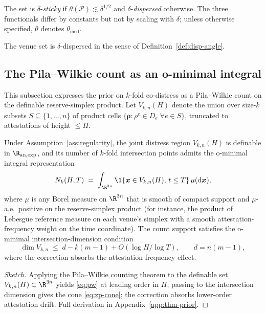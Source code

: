 The set is $\delta$-\emph{sticky} if
$\theta(\mathcal{P}) \lesssim \delta^{1/2}$ and
$\delta$-\emph{dispersed} otherwise. The three functionals differ by
constants but not by scaling with $\delta$; unless otherwise
specified, $\theta$ denotes $\theta_{\mathrm{med}}$.

\begin{assumption}\label{ass:dispersion}
The venue set is $\delta$-dispersed in the sense of
Definition~\ref{def:disp-angle}.
\end{assumption}

\subsection{The Pila--Wilkie count as an o-minimal integral}
\label{sec:common-factor}

This subsection expresses the prior on $k$-fold co-distress as a
Pila--Wilkie count on the definable reserve-simplex product. Let
$V_{k,n}(H)$ denote the union over size-$k$ subsets
$S \subseteq \{1,\dots,n\}$ of product cells
$\{\boldsymbol{\rho} : \rho^e \in D_e \; \forall e \in S\}$,
truncated to attestations of height $\le H$.

\begin{proposition}\label{prop:pw}
Under Assumption~\ref{ass:regularity}, the joint distress region
$V_{k,n}(H)$ is definable in $\R_{\mathrm{an},\exp}$, and its
number of $k$-fold intersection points admits the o-minimal
integral representation
\begin{equation}\label{eq:pw}
N_k(H,T) \;=\;
\int_{\R^{3n}} \1\{\boldsymbol{x} \in V_{k,n}(H),\, t \le T\}\,
\mu(\mathrm{d}\boldsymbol{x}),
\end{equation}
where $\mu$ is any Borel measure on $\R^{3n}$ that is smooth of
compact support and $\mu$-a.e.\ positive on the reserve-simplex
product (for instance, the product of Lebesgue reference measure on
each venue's simplex with a smooth attestation-frequency weight on
the time coordinate). The count support satisfies the o-minimal
intersection-dimension condition
\begin{equation}\label{eq:zp-cone}
\dim V_{k,n} \;\le\; d - k(m-1) + O(\log H / \log T),
\qquad d = n(m-1),
\end{equation}
where the correction absorbs the attestation-frequency effect.
\end{proposition}

\begin{proof}[Sketch]
Applying the Pila--Wilkie counting theorem \citep{PilaWilkie2006}
to the definable set $V_{k,n}(H) \subset \R^{3n}$ yields
\eqref{eq:pw} at leading order in $H$; passing to the intersection
dimension gives the cone \eqref{eq:zp-cone}; the correction absorbs
lower-order attestation drift. Full derivation in
Appendix~\ref{app:thm-prior}.
\end{proof}


